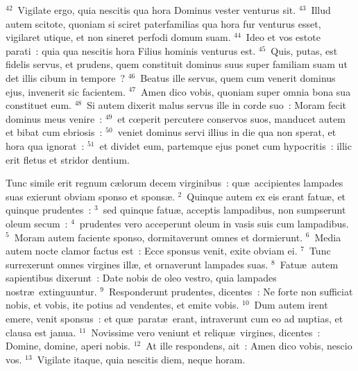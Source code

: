 ${}^{42}$~Vigilate ergo, quia nescitis qua hora Dominus vester venturus sit.
${}^{43}$~Illud autem scitote, quoniam si sciret paterfamilias qua hora fur venturus esset, vigilaret utique, et non sineret perfodi domum suam.
${}^{44}$~Ideo et vos estote parati~: quia qua nescitis hora Filius hominis venturus est.
${}^{45}$~Quis, putas, est fidelis servus, et prudens, quem constituit dominus suus super familiam suam ut det illis cibum in tempore~?
${}^{46}$~Beatus ille servus, quem cum venerit dominus ejus, invenerit sic facientem.
${}^{47}$~Amen dico vobis, quoniam super omnia bona sua constituet eum.
${}^{48}$~Si autem dixerit malus servus ille in corde suo~: Moram fecit dominus meus venire~:
${}^{49}$~et cœperit percutere conservos suos, manducet autem et bibat cum ebriosis~:
${}^{50}$~veniet dominus servi illius in die qua non sperat, et hora qua ignorat~:
${}^{51}$~et dividet eum, partemque ejus ponet cum hypocritis~: illic erit fletus et stridor dentium.

\lettrine[lines=10,image=true,loversize=0.05,lraise=-0.03]{T}{}unc simile erit regnum c\ae lorum decem virginibus~: qu\ae\ accipientes lampades suas exierunt obviam sponso et spons\ae .
${}^{2}$~Quinque autem ex eis erant fatu\ae , et quinque prudentes~:
${}^{3}$~sed quinque fatu\ae , acceptis lampadibus, non sumpserunt oleum secum~:
${}^{4}$~prudentes vero acceperunt oleum in vasis suis cum lampadibus.
${}^{5}$~Moram autem faciente sponso, dormitaverunt omnes et dormierunt.
${}^{6}$~Media autem nocte clamor factus est~: Ecce sponsus venit, exite obviam ei.
${}^{7}$~Tunc surrexerunt omnes virgines ill\ae , et ornaverunt lampades suas.
${}^{8}$~Fatu\ae\ autem sapientibus dixerunt~: Date nobis de oleo vestro, quia lampades nostr\ae\ extinguuntur.
${}^{9}$~Responderunt prudentes, dicentes~: Ne forte non sufficiat nobis, et vobis, ite potius ad vendentes, et emite vobis.
${}^{10}$~Dum autem irent emere, venit sponsus~: et qu\ae\ parat\ae\ erant, intraverunt cum eo ad nuptias, et clausa est janua.
${}^{11}$~Novissime vero veniunt et reliqu\ae\ virgines, dicentes~: Domine, domine, aperi nobis.
${}^{12}$~At ille respondens, ait~: Amen dico vobis, nescio vos.
${}^{13}$~Vigilate itaque, quia nescitis diem, neque horam.


